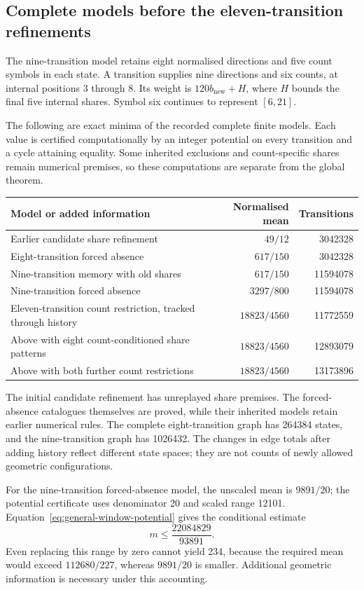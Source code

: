 \documentclass[11pt,a4paper]{article}
\theoremstyle{definition}
\theoremstyle{remark}
\begin{document}
\subsection{Complete models before the eleven-transition refinements}
The nine-transition model retains eight normalised directions and five count symbols in each state. A transition supplies nine directions and six counts, at internal positions 3 through 8. Its weight is $120b_{\mathrm{new}}+H$, where $H$ bounds the final five internal shares. Symbol six continues to represent $[6,21]$.

The following are exact minima of the recorded complete finite models. Each value is certified computationally by an integer potential on every transition and a cycle attaining equality. Some inherited exclusions and count-specific shares remain numerical premises, so these computations are separate from the global theorem.
\begin{center}\small
\begin{tabular}{p{}r r}
\toprule
Model or added information & Normalised mean & Transitions\\\midrule
Earlier candidate share refinement & $49/12$ & 3042328\\
Eight-transition forced absence & $617/150$ & 3042328\\
Nine-transition memory with old shares & $617/150$ & 11594078\\
Nine-transition forced absence & $3297/800$ & 11594078\\
Eleven-transition count restriction, tracked through history & $18823/4560$ & 11772559\\
Above with eight count-conditioned share patterns & $18823/4560$ & 12893079\\
Above with both further count restrictions & $18823/4560$ & 13173896\\
\bottomrule
\end{tabular}
\end{center}
The initial candidate refinement has unreplayed share premises. The forced-absence catalogues themselves are proved, while their inherited models retain earlier numerical rules. The complete eight-transition graph has 264384 states, and the nine-transition graph has 1026432. The changes in edge totals after adding history reflect different state spaces; they are not counts of newly allowed geometric configurations.

For the nine-transition forced-absence model, the unscaled mean is $9891/20$; the potential certificate uses denominator 20 and scaled range 12101. Equation~\eqref{eq:general-window-potential} gives the conditional estimate
\[
m\le\frac{22084829}{93891}.
\]
Even replacing this range by zero cannot yield 234, because the required mean would exceed $112680/227$, whereas $9891/20$ is smaller. Additional geometric information is necessary under this accounting.
\end{document}
